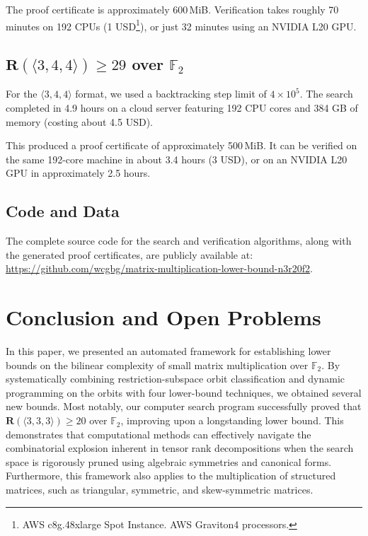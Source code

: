 \documentclass[11pt]{article}
\begin{document}
The proof certificate is approximately 600\,MiB.
Verification takes roughly 70 minutes on 192 CPUs (1 USD\footnote{AWS c8g.48xlarge Spot Instance. AWS Graviton4 processors.\label{fn:aws-c8g-48xlarge}}), or just 32 minutes using an NVIDIA L20 GPU.

\subsection{$\mathbf{R}(\langle 3,4,4\rangle)\ge 29$ over $\mathbb{F}_2$}
For the $\langle 3,4,4\rangle$ format, we used a backtracking step limit of $4\times 10^5$. The search completed in 4.9 hours on a cloud server featuring 192 CPU cores and 384 GB of memory (costing about 4.5 USD).

This produced a proof certificate of approximately 500\,MiB. It can be verified on the same 192-core machine in about 3.4 hours (3 USD), or on an NVIDIA L20 GPU in approximately 2.5 hours.

\subsection{Code and Data}

The complete source code for the search and verification algorithms, along with the generated proof certificates, are publicly available at: \\
\url{https://github.com/wcgbg/matrix-multiplication-lower-bound-n3r20f2}.

\section{Conclusion and Open Problems}\label{sec:conclusion}

In this paper, we presented an automated framework for establishing lower bounds on the bilinear complexity of small matrix multiplication over $\mathbb{F}_2$. By systematically combining restriction-subspace orbit classification and dynamic programming on the orbits with four lower-bound techniques, we obtained several new bounds. Most notably, our computer search program successfully proved that $\mathbf{R}(\langle 3,3,3\rangle) \ge 20$ over $\mathbb{F}_2$, improving upon a longstanding lower bound. This demonstrates that computational methods can effectively navigate the combinatorial explosion inherent in tensor rank decompositions when the search space is rigorously pruned using algebraic symmetries and canonical forms. Furthermore, this framework also applies to the multiplication of structured matrices, such as triangular, symmetric, and skew-symmetric matrices.
\end{document}

